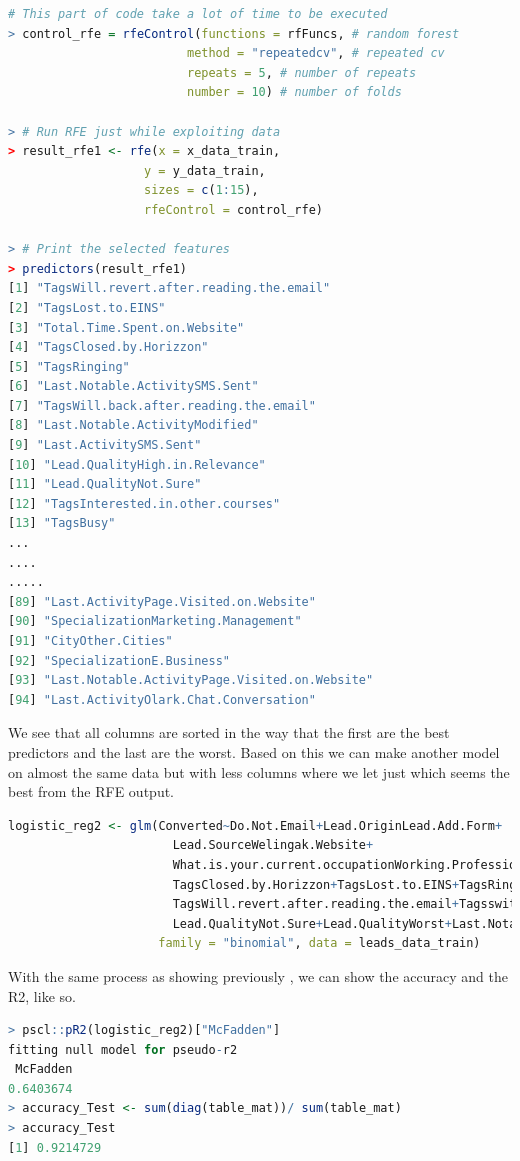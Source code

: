 \begin{lstlisting}[language=R]
# This part of code take a lot of time to be executed 
> control_rfe = rfeControl(functions = rfFuncs, # random forest
                         method = "repeatedcv", # repeated cv
                         repeats = 5, # number of repeats
                         number = 10) # number of folds

> # Run RFE just while exploiting data
> result_rfe1 <- rfe(x = x_data_train,
                   y = y_data_train,
                   sizes = c(1:15),
                   rfeControl = control_rfe)

> # Print the selected features
> predictors(result_rfe1)
[1] "TagsWill.revert.after.reading.the.email"
[2] "TagsLost.to.EINS"
[3] "Total.Time.Spent.on.Website"
[4] "TagsClosed.by.Horizzon"
[5] "TagsRinging"
[6] "Last.Notable.ActivitySMS.Sent"
[7] "TagsWill.back.after.reading.the.email"
[8] "Last.Notable.ActivityModified"
[9] "Last.ActivitySMS.Sent"
[10] "Lead.QualityHigh.in.Relevance"
[11] "Lead.QualityNot.Sure"
[12] "TagsInterested.in.other.courses"
[13] "TagsBusy"
...
....
.....
[89] "Last.ActivityPage.Visited.on.Website"
[90] "SpecializationMarketing.Management"
[91] "CityOther.Cities"
[92] "SpecializationE.Business"
[93] "Last.Notable.ActivityPage.Visited.on.Website"
[94] "Last.ActivityOlark.Chat.Conversation"
\end{lstlisting}
We see that all columns are sorted in the way that the first are the best predictors and the last are the worst.
Based on this we can make another model on almost the same data but with less columns where we let just which seems the best from the RFE output.
\begin{lstlisting}[language=R]
logistic_reg2 <- glm(Converted~Do.Not.Email+Lead.OriginLead.Add.Form+
                       Lead.SourceWelingak.Website+
                       What.is.your.current.occupationWorking.Professional+TagsBusy+
                       TagsClosed.by.Horizzon+TagsLost.to.EINS+TagsRinging+
                       TagsWill.revert.after.reading.the.email+Tagsswitched.off+
                       Lead.QualityNot.Sure+Lead.QualityWorst+Last.Notable.ActivitySMS.Sent,
                     family = "binomial", data = leads_data_train)
\end{lstlisting}
With the same process as showing previously , we can show the accuracy and the R2, like so.
\begin{lstlisting}[language=R]
> pscl::pR2(logistic_reg2)["McFadden"]
fitting null model for pseudo-r2
 McFadden 
0.6403674
> accuracy_Test <- sum(diag(table_mat))/ sum(table_mat)
> accuracy_Test
[1] 0.9214729
\end{lstlisting}
